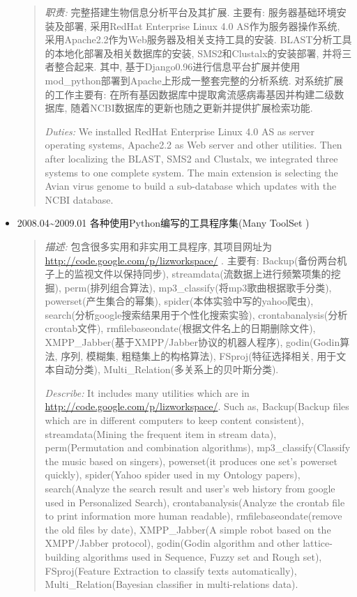 \documentclass[letterpaper,10pt,english]{manual}
\begin{document}
\begin{itemize}
\begin{quote}
\emph{职责:} 完整搭建生物信息分析平台及其扩展. 主要有: 服务器基础环境安装及部署, 采用RedHat Enterprise Linux 4.0 AS作为服务器操作系统, 采用Apache2.2作为Web服务器及相关支持工具的安装. BLAST分析工具的本地化部署及相关数据库的安装, SMS2和Clustalx的安装部署, 并将三者整合起来. 其中, 基于Django0.96进行信息平台扩展并使用mod\_python部署到Apache上形成一整套完整的分析系统. 对系统扩展的工作主要有: 在所有基因数据库中提取禽流感病毒基因并构建二级数据库, 随着NCBI数据库的更新也随之更新并提供扩展检索功能.

\emph{Duties:} We installed RedHat Enterprise Linux 4.0 AS as server operating systems, Apache2.2 as Web server and other utilities. Then after localizing the BLAST, SMS2 and Clustalx, we integrated three systems to one complete system. The main extension is selecting the Avian virus genome to build a sub-database which updates with the NCBI database.
\end{quote}

\item {} 
2008.04\textasciitilde{}2009.01 各种使用Python编写的工具程序集(Many ToolSet )
\begin{quote}

\emph{描述:} 包含很多实用和非实用工具程序, 其项目网址为 \href{http://code.google.com/p/lizworkspace/}{http://code.google.com/p/lizworkspace/} . 主要有: Backup(备份两台机子上的监视文件以保持同步), streamdata(流数据上进行频繁项集的挖掘), perm(排列组合算法), mp3\_classify(将mp3歌曲根据歌手分类), powerset(产生集合的幂集), spider(本体实验中写的yahoo爬虫), search(分析google搜索结果用于个性化搜索实验), crontabanalysis(分析crontab文件), rmfilebaseondate(根据文件名上的日期删除文件), XMPP\_Jabber(基于XMPP/Jabber协议的机器人程序), godin(Godin算法, 序列, 模糊集, 粗糙集上的构格算法), FSproj(特征选择相关, 用于文本自动分类), Multi\_Relation(多关系上的贝叶斯分类).

\emph{Describe:} It includes many utilities which are in \href{http://code.google.com/p/lizworkspace/}{http://code.google.com/p/lizworkspace/}. Such as, Backup(Backup files which are in different computers to keep content consistent), streamdata(Mining the frequent item in stream data), perm(Permutation and combination algorithms), mp3\_classify(Classify the music based on singers), powerset(it produces one set's powerset quickly), spider(Yahoo spider used in my Ontology papers), search(Analyze the search result and user's web history from google used in Personalized Search), crontabanalysis(Analyze the crontab file to print information more human readable), rmfilebaseondate(remove the old files by date), XMPP\_Jabber(A simple robot  based on the XMPP/Jabber protocol), godin(Godin algorithm and other lattice-building algorithms used in Sequence, Fuzzy set and Rough set), FSproj(Feature Extraction to classify texts automatically), Multi\_Relation(Bayesian classifier in multi-relations data).
\end{quote}

\end{itemize}
\end{document}
